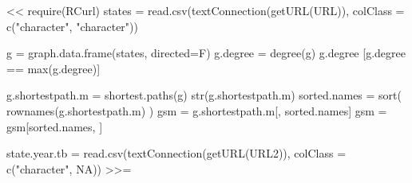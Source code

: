 \documentclass{article}
\begin{document}



<<
require(RCurl)
states = read.csv(textConnection(getURL(URL)), colClass = c("character", "character"))

g = graph.data.frame(states, directed=F)
g.degree = degree(g)
g.degree [g.degree == max(g.degree)] 

g.shortestpath.m = shortest.paths(g)
str(g.shortestpath.m)
sorted.names = sort( rownames(g.shortestpath.m) )
gsm = g.shortestpath.m[, sorted.names]
gsm = gsm[sorted.names, ]

state.year.tb = read.csv(textConnection(getURL(URL2)), colClass = c("character", NA))
>>=
\end{document}
